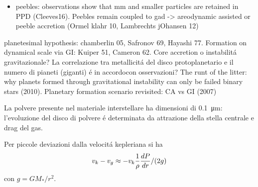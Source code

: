 \begin{workout}
	\begin{itemize}
		\item peebles: observations show that mm and smaller particles are retained in PPD (Cleeves16). Peebles remain coupled to gad -> areodynamic assisted or peeble accretion (Ormel klahr 10, Lambrechts jOhansen 12)
		
	\end{itemize}
\end{workout}

\begin{workout}[Refs GI vs CA]
planetesimal hypothesis: chamberlin 05, Safronov 69, Hayashi 77. Formation on dynamical scale via GI: Kuiper 51, Cameron 62.
Core accretion o instabilit\'a gravitazionale?
La correlazione tra metallicit\'a del disco protoplanetario e il numero di pianeti (giganti) \'e in accordocon osservazioni?
The runt of the litter: why planets formed through gravitational instability can only be failed binary stars (2010).
Planetary formation scenario revisited: CA vs GI (2007)
\end{workout}

\begin{workout}

\end{workout}


\begin{errata}
La polvere presente nel materiale interstellare ha dimensioni di \SI{0.1}{\micro\meter}: l'evoluzione del disco di polvere \'e determinata da attrazione della stella centrale e drag del gas.
\end{errata}

\begin{workout}
Per piccole deviazioni dalla velocit\'a kepleriana si ha
\begin{equation}
v_k-v_g\approx -v_k\frac{1}{\rho}\TDy{r}{P}/(2g)\label{eq:velocitykg}
\end{equation}
con $g=GM_*/r^2$.
\end{workout}

